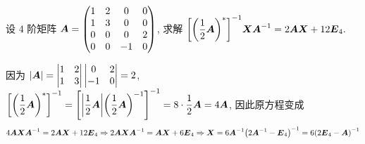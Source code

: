 \begin{example}
    设 $4$ 阶矩阵 $\vb*{A}=\begin{pmatrix}
            1 & 2 & 0  & 0 \\
            1 & 3 & 0  & 0 \\
            0 & 0 & 0  & 2 \\
            0 & 0 & -1 & 0
        \end{pmatrix}$, 求解 $\qty[\qty(\dfrac{1}{2}\vb*{A})^*]^{-1}\vb*{XA}^{-1}=2\vb*{AX}+12\vb*{E}_4.$
\end{example}
\begin{solution}
    因为 $|\vb*{A}|=\begin{vmatrix}
            1 & 2 \\
            1 & 3
        \end{vmatrix}
        \begin{vmatrix}
            0  & 2 \\
            -1 & 0
        \end{vmatrix}=2$, $\qty[\qty(\dfrac{1}{2}\vb*{A})^*]^{-1}=\qty[\qty|\dfrac{1}{2}\vb*{A}|\qty(\dfrac{1}{2}\vb*{A})^{-1}]^{-1}=8\cdot \dfrac{1}{2}\vb*{A}=4\vb*{A}$, 
    因此原方程变成 $$4\vb*{AXA}^{-1}=2\vb*{AX}+12\vb*{E}_4\Rightarrow 2\vb*{AXA}^{-1}=\vb*{AX}+6\vb*{E}_4\Rightarrow \vb*{X}=6\vb*{A}^{-1}\qty(2\vb*{A}^{-1}-\vb*{E}_4)^{-1}=6\qty(2\vb*{E}_4-\vb*{A})^{-1}$$
\end{solution}
